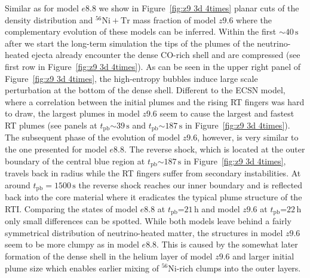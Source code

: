 \documentclass[fleqn,usenatbib]{mnras}
\newcommand{\tpb}{\ensuremath{t_{\text{pb}}}}
\newcommand{\nickel}{\ensuremath{\mathrm{^{56}Ni}}\xspace}
\newcommand{\tracer}{\ensuremath{\mathrm{Tr}}\xspace}
\newcommand{\s}{\ensuremath{\text{s}}}
\begin{document}
Similar as for model $e8.8$ we show in Figure~\ref{fig:z9 3d 4times} planar cuts of the density distribution and $\nickel+\tracer$ mass fraction of model $z9.6$ where the complementary evolution of these models can be inferred.
Within the first $\mathord{\sim}40\,\s$ after we start the long-term simulation the tips of the plumes of the neutrino-heated ejecta already encounter the dense CO-rich shell and are compressed (see first row in Figure~\ref{fig:z9 3d 4times}).
As can be seen in the upper right panel of Figure~\ref{fig:z9 3d 4times}, the high-entropy bubbles induce large scale perturbation at the bottom of the dense shell. Different to the ECSN model, where a correlation between the initial plumes and the rising RT fingers was hard to draw, the largest plumes in model $z9.6$ seem to cause the largest and fastest RT plumes (see panels at $\tpb\mathord{\sim}39\,\s$ and $\tpb\mathord{\sim}187\,\s$ in Figure~\ref{fig:z9 3d 4times}). 
The subsequent phase of the evolution of model $z9.6$, however, is very similar to the one presented for model $e8.8$.
The reverse shock, which is located at the outer boundary of the central blue region at $\tpb\mathord{\sim}187\,\s$ in Figure~\ref{fig:z9 3d 4times}, travels back in radius while the RT fingers suffer from secondary instabilities. 
At around $\tpb=1500\,\s$ the reverse shock reaches our inner boundary and is reflected back into the core material where it eradicates the typical plume structure of the RTI.
Comparing the states of model $e8.8$ at $\tpb\mathord{=}21\,\text{h}$ and model $z9.6$ at $\tpb\mathord{=}22\,\text{h}$ only small differences can be spotted. While both models leave behind a fairly symmetrical distribution of neutrino-heated matter, the structures in model $z9.6$ seem to be more clumpy as in model $e8.8$. This is caused by the somewhat later formation of the dense shell in the helium layer of model $z9.6$ and larger initial plume size which enables earlier mixing of \nickel-rich clumps into the outer layers. 
\end{document}
